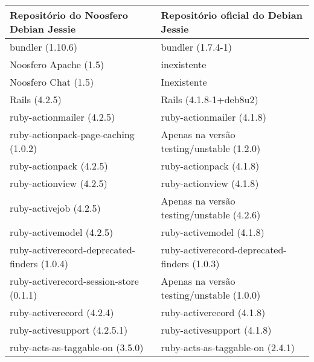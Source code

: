 \begin{table}[H]
    \begin{tabular}{l|l}
        \hline
        Repositório do Noosfero Debian Jessie & Repositório oficial do Debian Jessie                   \\ \hline
        bundler (1.10.6)                                 & bundler (1.7.4-1)                                                 \\ 
        Noosfero Apache (1.5)                            & inexistente                                                       \\ 
        Noosfero Chat (1.5)                              & Inexistente                                                       \\ 
        Rails (4.2.5)                                    & Rails (4.1.8-1+deb8u2)                                            \\ 
        ruby-actionmailer (4.2.5)                        & ruby-actionmailer (4.1.8)                                         \\ 
        ruby-actionpack-page-caching (1.0.2)             & Apenas na versão testing/unstable (1.2.0)  \\ 
        ruby-actionpack (4.2.5)                          & ruby-actionpack (4.1.8)                                           \\ 
        ruby-actionview (4.2.5)                          & ruby-actionview (4.1.8)                                           \\ 
         ruby-activejob (4.2.5)                          & Apenas na versão testing/unstable (4.2.6)  \\ 
        ruby-activemodel (4.2.5)                         & ruby-activemodel (4.1.8)                                          \\ 
        ruby-activerecord-deprecated-finders (1.0.4)     & ruby-activerecord-deprecated-finders (1.0.3)                      \\ 
        ruby-activerecord-session-store (0.1.1)          & Apenas na versão testing/unstable (1.0.0)  \\ 
        ruby-activerecord (4.2.4)                        & ruby-activerecord (4.1.8)                                         \\ 
        ruby-activesupport (4.2.5.1)                     & ruby-activesupport (4.1.8)                                        \\ 
        ruby-acts-as-taggable-on (3.5.0)                 & ruby-acts-as-taggable-on (2.4.1)                                  \\ 

\end{tabular}
\end{table}

